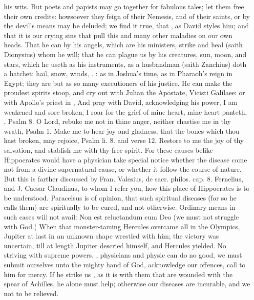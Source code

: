 {{his wits. But poets and papists may go together for fabulous tales; let
them free their own credits: howsoever they feign of their Nemesis, and
of their saints, or by the devil's means may be deluded; we find it
true, that , as David
styles him; and that it is our crying sins that pull this and many
other maladies on our own heads. That he can by his angels, which are
his ministers, strike and heal (saith Dionysius) whom he will;
that he can plague us by his creatures, sun, moon, and stars, which he
useth as his instruments, as a husbandman (saith Zanchius) doth a
hatchet: hail, snow, winds, \etc{}. : as in Joshua's time, as in Pharaoh's reign in Egypt; they are
but as so many executioners of his justice. He can make the proudest
spirits stoop, and cry out with Julian the Apostate, Vicisti Galilaee:
or with Apollo's priest in \Chrysostom{},  And pray with David, acknowledging
his power, I am weakened and sore broken, I roar for the grief of mine
heart, mine heart panteth, \etc{}. Psalm  8. O Lord, rebuke me not
in thine anger, neither chastise me in thy wrath, Psalm  1.
Make me to hear joy and gladness, that the bones which thou hast
broken, may rejoice, Psalm li. 8. and verse 12. Restore to me the joy
of thy salvation, and stablish me with thy free spirit. For these
causes belike Hippocrates would have a physician take special
notice whether the disease come not from a divine supernatural cause,
or whether it follow the course of nature. But this is farther
discussed by Fran. Valesius, de sacr. philos. cap. 8.  Fernelius,
and J. Caesar Claudinus, to whom I refer you, how this place of
Hippocrates is to be understood. Paracelsus is of opinion, that such
spiritual diseases (for so he calls them) are spiritually to be cured,
and not otherwise. Ordinary means in such cases will not avail: Non est
reluctandum cum Deo (we must not struggle with God.) When that
monster-taming Hercules overcame all in the Olympics, Jupiter at last
in an unknown shape wrestled with him; the victory was uncertain, till
at length Jupiter descried himself, and Hercules yielded. No striving
with supreme powers. ,
physicians and physic can do no good, we must submit ourselves
unto the mighty hand of God, acknowledge our offences, call to him for
mercy. If he strike us , as it
is with them that are wounded with the spear of Achilles, he alone must
help; otherwise our diseases are incurable, and we not to be relieved.

}}
